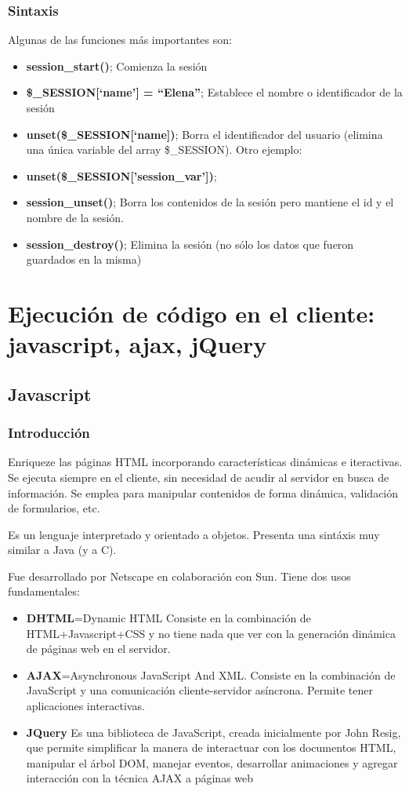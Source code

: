 \documentclass{apuntes}
\begin{document}
\subsubsection{Sintaxis}
Algunas de las funciones más importantes son:
\begin{itemize}
\item \textbf{session\_start()}; Comienza la sesión
\item \textbf{\$\_SESSION[‘name’] = “Elena”}; Establece el nombre o identificador  de la sesión
\item \textbf{unset(\$\_SESSION[‘name])}; Borra el identificador del usuario (elimina una única variable del array \$\_SESSION). Otro ejemplo:
\item \textbf{unset(\$\_SESSION['session\_var'])};
\item \textbf{session\_unset()}; Borra los contenidos de la sesión pero mantiene el id y el nombre de la sesión.
\item \textbf{session\_destroy()}; Elimina la sesión (no sólo los datos que fueron guardados en la misma)
\end{itemize}

\section{Ejecución de código en el cliente: javascript, ajax, jQuery}

\subsection{Javascript}
\subsubsection{Introducción}
Enriqueze las páginas HTML incorporando características dinámicas e iteractivas. Se ejecuta siempre en el cliente, sin necesidad de acudir al servidor en busca de información. Se emplea para manipular contenidos de forma dinámica, validación de formularios, etc.

Es un lenguaje interpretado y orientado a objetos. Presenta una sintáxis muy similar a Java (y a C).

Fue desarrollado por Netscape en colaboración con Sun. Tiene dos usos fundamentales:
\begin{itemize}
\item \textbf{DHTML}=Dynamic HTML
Consiste en la combinación de HTML+Javascript+CSS y no tiene nada que ver con la generación dinámica de páginas web en el servidor.
\item \textbf{AJAX}=Asynchronous JavaScript And XML.
Consiste en la combinación de JavaScript y una comunicación cliente-servidor asíncrona. Permite tener aplicaciones interactivas.

\item \textbf{JQuery}
Es una biblioteca de JavaScript, creada inicialmente por John Resig, que permite simplificar la manera de interactuar con los documentos HTML, manipular el árbol DOM, manejar eventos, desarrollar animaciones y agregar interacción con la técnica AJAX a páginas web
\end{itemize}
\end{document}
